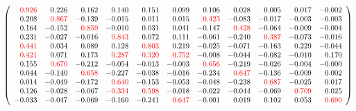 \documentclass[]{article}
\begin{document}
\[
\left(
\begin{array}{rrrrrrrrrrr}
\color{red} 0.926 & 0.226 & 0.162 & 0.140 & 0.151 & 0.099 & 0.106 & 0.028 & 0.005 & 0.017 & -0.002 \\
0.208 & \color{red} 0.867 & -0.139 & -0.015 & 0.011 & 0.015 & \color{red} 0.423 & -0.083 & -0.017 & -0.003 & -0.003 \\
0.164 & -0.152 & \color{red} 0.859 & -0.010 & 0.031 & 0.041 & -0.147 & \color{red} 0.428 & -0.064 & -0.009 & -0.004 \\
0.231 & -0.027 & -0.016 & \color{red} 0.843 & 0.072 & 0.111 & -0.061 & -0.240 & \color{red} 0.387 & -0.073 & -0.016 \\
\color{red} 0.441 & 0.034 & 0.089 & 0.128 & \color{red} 0.803 & 0.219 & -0.025 & -0.071 & -0.163 & 0.229 & -0.044 \\
\color{red} 0.421 & 0.071 & 0.173 & \color{red} 0.287 & \color{red} 0.320 & \color{red} 0.752 & -0.008 & -0.044 & -0.082 & -0.010 & 0.170 \\
0.155 & \color{red} 0.670 & -0.212 & -0.054 & -0.013 & -0.003 & \color{red} 0.656 & -0.219 & -0.026 & -0.004 & -0.000 \\
0.044 & -0.140 & \color{red} 0.658 & -0.227 & -0.038 & -0.016 & -0.234 & \color{red} 0.647 & -0.136 & -0.009 & 0.002 \\
0.014 & -0.049 & -0.172 & \color{red} 0.640 & -0.153 & -0.053 & -0.048 & -0.238 & \color{red} 0.687 & -0.025 & 0.017 \\
0.126 & -0.028 & -0.067 & \color{red} -0.334 & \color{red} 0.598 & -0.018 & -0.022 & -0.044 & -0.069 & \color{red} 0.709 & 0.025 \\
-0.033 & -0.047 & -0.069 & -0.160 & -0.241 & \color{red} 0.647 & -0.001 & 0.019 & 0.102 & 0.053 & \color{red} 0.690 \\
\end{array}
\right)
\]
\end{document}
